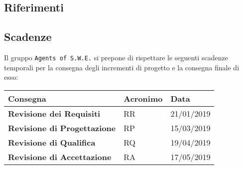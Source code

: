 \subsection{Riferimenti}

\newpage

\subsection{Scadenze}
Il gruppo \texttt{Agents of S.W.E.} si prepone di rispettare le seguenti scadenze temporali per la consegna degli incrementi di progetto e la consegna finale di esso:

\begin{longtable}{m{6cm} m{2cm} p{2cm}}
\hline

\rowcolor{bluelogo}\color{white}\textbf{Consegna} & \color{white}\textbf{Acronimo} & \color{white}\textbf{Data} \\
\hline

\rowcolor{beigechiaro}\color{black} \textbf{Revisione dei Requisiti} & \centering RR & 21/01/2019 \\
\hline
\rowcolor{beigescuro}\color{black} \textbf{Revisione di Progettazione} & \centering RP & 15/03/2019 \\
\hline
\rowcolor{beigechiaro}\color{black} \textbf{Revisione di Qualifica} & \centering RQ & 19/04/2019 \\
\hline
\rowcolor{beigescuro}\color{black} \textbf{Revisione di Accettazione} & \centering RA & 17/05/2019 \\
\hline
	  
\end{longtable}